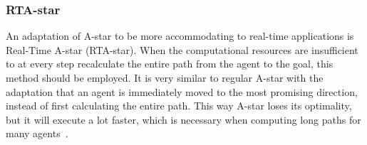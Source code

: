 			\subsubsection{RTA-star}
				An adaptation of A-star to be more accommodating to real-time applications is Real-Time A-star (RTA-star). When the computational resources are insufficient to at every step recalculate the entire path from the agent to the goal, this method should be employed. It is very similar to regular A-star with the adaptation that an agent is immediately moved to the most promising direction, instead of first calculating the entire path. This way A-star loses its optimality, but it will execute a lot faster, which is necessary when computing long paths for many agents~\cite{korf1990real}.